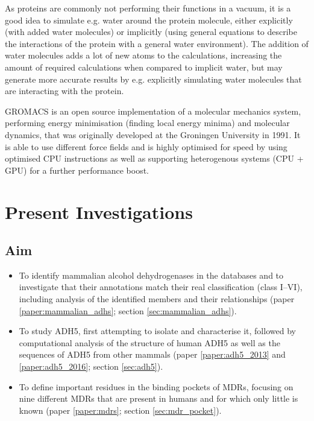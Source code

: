 \documentclass[a4paper, twoside, 12pt, openright]{report}
\begin{document}
As proteins are commonly not performing their functions in a vacuum, it is a good idea to simulate e.g. water around the protein molecule, either explicitly (with added water molecules) or implicitly (using general equations to describe the interactions of the protein with a general water environment). The addition of water molecules adds a lot of new atoms to the calculations, increasing the amount of required calculations when compared to implicit water, but may generate more accurate results by e.g. explicitly simulating water molecules that are interacting with the protein.

GROMACS\cite{abraham_gromacs:_2015}  is an open source implementation of a molecular mechanics system, performing energy minimisation (finding local energy minima) and molecular dynamics, that was originally developed at the Groningen University in 1991. It is able to use different force fields and is highly optimised for speed by using optimised CPU instructions as well as supporting heterogenous systems (CPU + GPU) for a further performance boost\cite{abraham_gromacs:_2015}.


\chapter{Present Investigations}
\label{sec:projects}

\section{Aim}
\label{sec:aim}
\begin{itemize}
 \item To identify mammalian alcohol dehydrogenases in the databases and to investigate that their annotations match their real classification (class I--VI), including analysis of the identified members and their relationships (paper \ref{paper:mammalian_adhs}; section \ref{sec:mammalian_adhs}).
 
 \item To study ADH5, first attempting to isolate and characterise it, followed by computational analysis of the structure of human ADH5 as well as the sequences of ADH5 from other mammals (paper \ref{paper:adh5_2013} and \ref{paper:adh5_2016}; section \ref{sec:adh5}).
 
 \item To define important residues in the binding pockets of MDRs, focusing on nine different MDRs that are present in humans and for which only little is known (paper \ref{paper:mdrs}; section \ref{sec:mdr_pocket}).
 
\end{itemize}
\end{document}
